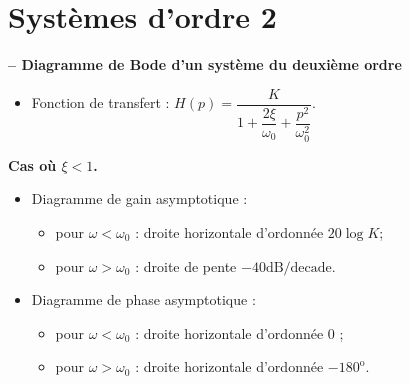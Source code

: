 \vspace{-.5cm}

\section{Systèmes d'ordre 2}
\begin{resultat}\textbf{\textsf{\small -- Diagramme de Bode d'un système du deuxième ordre}} ~\\

\vspace{-.5cm}

\noindent\begin{minipage}[c]{.53\linewidth}
\begin{itemize}
\item Fonction de transfert : $H(p)=\dfrac{K}{1+\dfrac{2\xi}{\omega_0}+\dfrac{p^2}{\omega_0^2}}$.
\end{itemize}
\begin{center}
\textbf{Cas où $\xi<1$.}
\end{center}
\begin{itemize}
\item Diagramme de gain asymptotique : 
\begin{itemize}
\item pour $\omega<\omega_0$ : droite horizontale d'ordonnée $20 \log K$;
\item pour $\omega>\omega_0$ : droite de pente $-{40}\text{dB/decade}$.
\end{itemize}
\item Diagramme de phase asymptotique : 
\begin{itemize}
\item pour $\omega<\omega_0$ : droite horizontale d'ordonnée 0 \degre;
\item pour $\omega>\omega_0$ : droite horizontale d'ordonnée $-180^{\text{o}}$.
\end{itemize}
\end{itemize}
\end{minipage} \hfill
\begin{minipage}[c]{.45\linewidth}

\end{minipage}


\end{resultat}
